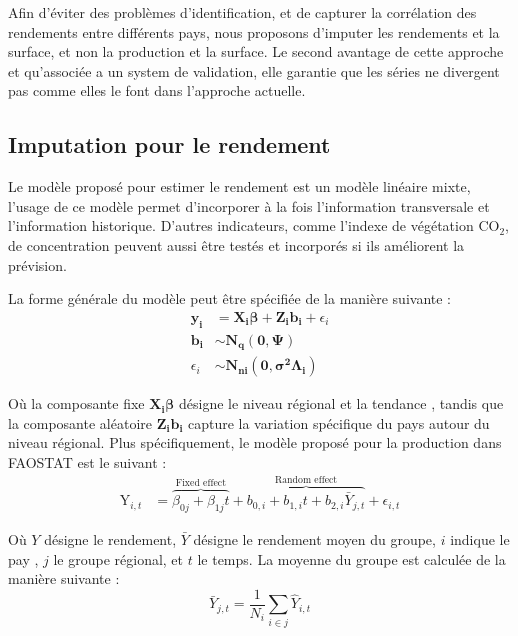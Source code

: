 \documentclass[nojss]{jss}\usepackage{graphicx, color}
\begin{document}
Afin d'\'{e}viter des probl\`{e}mes d'identification, et de capturer
la corr\'{e}lation des rendements entre diff\'{e}rents pays, nous
proposons d'imputer les rendements et la surface, et non la production
et la surface. Le second avantage de cette approche et qu'associ\'{e}e
a un system de validation, elle garantie que les s\'{e}ries ne
divergent pas comme elles le font dans l'approche actuelle.

\subsection{Imputation pour le rendement}
Le mod\`{e}le propos\'{e} pour estimer le rendement est un mod\`{e}le
lin\'{e}aire mixte, l'usage de ce mod\`{e}le permet d'incorporer \`{a}
la fois l'information transversale et l'information
historique. D'autres indicateurs, comme l'indexe de v\'{e}g\'{e}tation
$\text{CO}_2$, de concentration peuvent aussi être test\'{e}s et
incorpor\'{e}s si ils am\'{e}liorent la pr\'{e}vision.

La forme g\'{e}n\'{e}rale du mod\`{e}le peut être sp\'{e}cifi\'{e}e de
la mani\`{e}re suivante :
\begin{align}
  \mathbf{y_i} &= \mathbf{X_i}\boldsymbol{\beta} +
  \mathbf{Z_i}\mathbf{b_i} + \epsilon_i \nonumber\\
  \mathbf{b_i} &\sim \mathbf{N_q}(\mathbf{0}, \boldsymbol{\Psi})\nonumber\\
  \epsilon_i &\sim \mathbf{N_{ni}}(\mathbf{0},
  \boldsymbol{\sigma^2}\boldsymbol{\Lambda_i})
\end{align}

Où la composante fixe $\mathbf{X_i}\boldsymbol{\beta}$ d\'{e}signe le
niveau r\'{e}gional et la tendance , tandis que la composante
al\'{e}atoire $\mathbf{Z_i}\mathbf{b_i}$ capture la variation
sp\'{e}cifique du pays autour du niveau r\'{e}gional. Plus
sp\'{e}cifiquement, le mod\`{e}le propos\'{e} pour la production dans
FAOSTAT est le suivant :
\begin{align}
  \label{eq:lmeImpute}
  \text{Y}_{i,t} &= \overbrace{\beta_{0j} + \beta_{1j}t}^{\text{Fixed
      effect}} + \overbrace{b_{0,i} + b_{1,i}t +
    b_{2,i}\bar{Y}_{j,t}}^{\text{Random effect}} + \epsilon_{i,t}
\end{align}

O\`{u} $Y$ d\'{e}signe le rendement, $\bar{Y}$ d\'{e}signe le rendement
moyen du groupe, $i$ indique le pay , $j$ le groupe r\'{e}gional, et
$t$ le temps. La moyenne du groupe est calcul\'{e}e de la mani\`{e}re
suivante :
\begin{equation}
  \label{eq:averageYield}
  \bar{Y}_{j, t} = \frac{1}{N_i}\sum_{i \in j} \hat{Y}_{i,t}
\end{equation}
\end{document}
